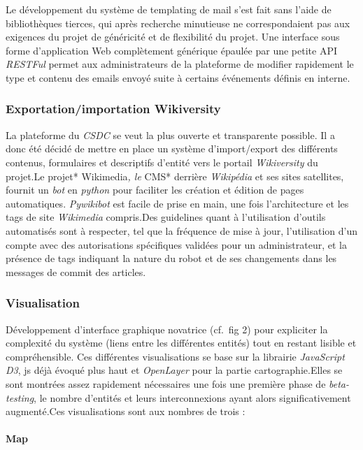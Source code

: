 \documentclass[french, 11pt]{memoir}
\begin{document}
Le développement du système de templating de mail s'est fait sans l'aide
de bibliothèques tierces, qui après recherche minutieuse ne
correspondaient pas aux exigences du projet de généricité et de
flexibilité du projet. Une interface sous forme d'application Web
complètement générique épaulée par une petite API \emph{RESTFul} permet
aux administrateurs de la plateforme de modifier rapidement le type et
contenu des emails envoyé suite à certains événements définis en
interne.

\subsubsection{Exportation/importation
	Wikiversity}\label{exportationimportation-wikiversity}

La plateforme du \emph{CSDC} se veut la plus ouverte et transparente
possible. Il a donc été décidé de mettre en place un système
d'import/export des différents contenus, formulaires et descriptifs
d'entité vers le portail \emph{Wikiversity} du projet.Le projet*
Wikimedia\emph{, le }CMS* derrière \emph{Wikipédia} et ses sites
satellites, fournit un \emph{bot} en \emph{python} pour faciliter les
création et édition de pages automatiques. \emph{Pywikibot} est facile
de prise en main, une fois l'architecture et les tags de site
\emph{Wikimedia} compris.Des guidelines quant à l'utilisation d'outils
automatisés sont à respecter, tel que la fréquence de mise à jour,
l'utilisation d'un compte avec des autorisations spécifiques validées
pour un administrateur, et la présence de tags indiquant la nature du
robot et de ses changements dans les messages de commit des articles.

\subsubsection{Visualisation}\label{visualisation-1}

Développement d'interface graphique novatrice (cf.~fig 2) pour
expliciter la complexité du système (liens entre les différentes
entités) tout en restant lisible et compréhensible. Ces différentes
visualisations se base sur la librairie \emph{JavaScript D3}, js déjà
évoqué plus haut et \emph{OpenLayer} pour la partie cartographie.Elles
se sont montrées assez rapidement nécessaires une fois une première
phase de \emph{beta-testing}, le nombre d'entités et leurs
interconnexions ayant alors significativement augmenté.Ces
visualisations sont aux nombres de trois :

\paragraph{Map}\label{map}
\end{document}
